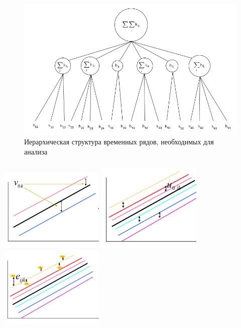\documentclass[c, dvipsnames]{beamer}  %
\begin{document}
\begin{frame}[shrink=5]
\frametitle{\insertsection} 
\framesubtitle{\insertsubsection}



\begin{figure}
	\centering
	\includegraphics[width=0.8\linewidth]{Screenshot51}
	\caption{Иерархическая структура временных рядов, необходимых для анализа}
	\label{fig:screenshot51}
\end{figure}



\end{frame}


\begin{frame}[shrink=5]
\frametitle{\insertsection} 
\framesubtitle{\insertsubsection}

	\hfil\hfil\includegraphics[width=5cm]{screenshot003}\newline
	\null\hfil\hfil{}\newline
	\vfil
	\hfil\hfil\includegraphics[width=5cm]{screenshot004}\hfil\hfil
	\includegraphics[width=5cm]{screenshot005}\newline
	\null\hfil\hfil{}
	\hfil\hfil{}

\end{frame}
\end{document}
